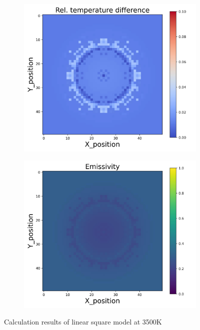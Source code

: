\begin{figure}[htbp]
\begin{minipage}{\textwidth}
\begin{subfigure}{0.325\textwidth}
        \end{subfigure}
        \begin{subfigure}{0.325\textwidth}
            \centering
            \includegraphics[width=\textwidth]{figures/raw_data/5/T3500/lin_square/T_bias.jpg}
        \end{subfigure}
        \begin{subfigure}{0.325\textwidth}
            \centering
            \includegraphics[width=\textwidth]{figures/raw_data/5/T3500/lin_square/emi_cal.jpg}
        \end{subfigure}
    \end{minipage}
    \caption{Calculation results of linear square model at 3500K}
    \label{fig: result_lin_square_model_3500}
\end{figure}


